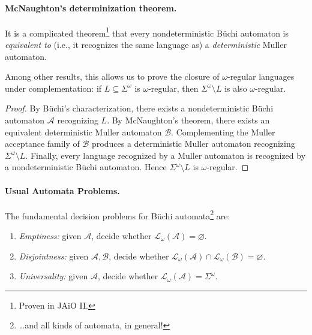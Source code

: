 \documentclass[11pt,a4paper]{tutorial}
\newcommand{\Lang}{\mathcal{L}}
\let\L=\Lang
\begin{document}
\paragraph{McNaughton's determinization theorem.}
It is a complicated theorem\footnote{Proven in JAiO II.} that every nondeterministic Büchi automaton 
is \emph{equivalent to} (i.e., it recognizes the same language as)
a \emph{deterministic} Muller automaton.

Among other results, this allows us to prove the closure of
$\omega$-regular languages under complementation:
if $L\subseteq\Sigma^\omega$ is $\omega$-regular, then
\(
\Sigma^\omega\setminus L
\)
is also $\omega$-regular.

\begin{proof}
By Büchi's characterization, there exists a nondeterministic
Büchi automaton $\mathcal A$ recognizing $L$.
By McNaughton's theorem, there exists an equivalent deterministic
Muller automaton $\mathcal B$.
Complementing the Muller acceptance family of $\mathcal B$
produces a deterministic Muller automaton recognizing
$\Sigma^\omega\setminus L$.
Finally, every language recognized by a Muller automaton is
recognized by a nondeterministic Büchi automaton. Hence
$\Sigma^\omega\setminus L$ is $\omega$-regular.
\end{proof}

\paragraph{Usual Automata Problems.}
The fundamental decision problems for Büchi automata\footnote{\ldots and all kinds of automata, in general!}
are:
\begin{enumerate}
\item \emph{Emptiness:}
given $\mathcal A$, decide whether
\(\L_\omega(\mathcal A)=\varnothing\).
\item \emph{Disjointness:}
given $\mathcal A,\mathcal B$, decide whether
\(\L_\omega(\mathcal A)\cap\L_\omega(\mathcal B)
=\varnothing\).
\item \emph{Universality:}
given $\mathcal A$, decide whether
\(\L_\omega(\mathcal A)=\Sigma^\omega\).
\end{enumerate}


%
%
\end{document}

